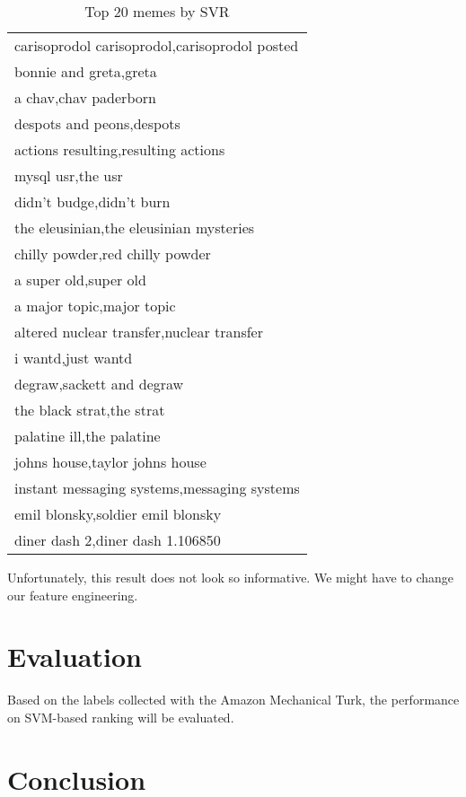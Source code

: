 \documentclass{sig-alternate}
\begin{document}
\begin{table*}[h!b!p!]
\begin{center}
\begin{tabular}{|p{15cm}|}
\hline
carisoprodol carisoprodol,carisoprodol posted\\
bonnie and greta,greta\\
a chav,chav paderborn\\
despots and peons,despots\\
actions resulting,resulting actions\\
mysql usr,the usr\\
didn't budge,didn't burn\\
the eleusinian,the eleusinian mysteries\\
chilly powder,red chilly powder\\
a super old,super old\\
a major topic,major topic\\
altered nuclear transfer,nuclear transfer\\
i wantd,just wantd\\
degraw,sackett and degraw\\
the black strat,the strat\\
palatine ill,the palatine\\
johns house,taylor johns house\\
instant messaging systems,messaging systems\\
emil blonsky,soldier emil blonsky\\
diner dash 2,diner dash 1.106850\\
\hline
\end{tabular}
\caption{Top 20 memes by SVR}
\label{table:svr_result}
\end{center}
\end{table*}

Unfortunately, this result does not look so informative. We might have to change our feature engineering.

\section{Evaluation}

Based on the labels collected with the Amazon Mechanical Turk, the performance on SVM-based ranking will be evaluated.

\section{Conclusion}
\end{document}
